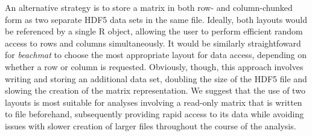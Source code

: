 \documentclass{article}
\newcommand{\beachmat}{\textit{beachmat}}
\begin{document}
An alternative strategy is to store a matrix in both row- and column-chunked form as two separate HDF5 data sets in the same file.
Ideally, both layouts would be referenced by a single R object, allowing the user to perform efficient random access to rows and columns simultaneously.
It would be similarly straightfoward for \beachmat{} to choose the most appropriate layout for data access, depending on whether a row or column is requested.
Obviously, though, this approach involves writing and storing an additional data set, doubling the size of the HDF5 file and slowing the creation of the matrix representation.
We suggest that the use of two layouts is most suitable for analyses involving a read-only matrix that is written to file beforehand, subsequently providing rapid access to its data while avoiding issues with slower creation of larger files throughout the course of the analysis.
\end{document}
